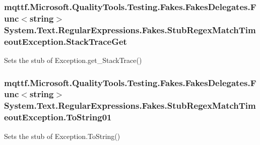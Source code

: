 \hypertarget{class_system_1_1_text_1_1_regular_expressions_1_1_fakes_1_1_stub_regex_match_timeout_exception_a6d79cfcf58c9b94d87359c6d5faeb21f}{
\subsubsection[{Stack\-Trace\-Get}]{\setlength{\rightskip}{0pt plus 5cm}mqttf.\-Microsoft.\-Quality\-Tools.\-Testing.\-Fakes.\-Fakes\-Delegates.\-Func$<$string$>$ System.\-Text.\-Regular\-Expressions.\-Fakes.\-Stub\-Regex\-Match\-Timeout\-Exception.\-Stack\-Trace\-Get}}\label{class_system_1_1_text_1_1_regular_expressions_1_1_fakes_1_1_stub_regex_match_timeout_exception_a6d79cfcf58c9b94d87359c6d5faeb21f}


Sets the stub of Exception.\-get\-\_\-\-Stack\-Trace()

\hypertarget{class_system_1_1_text_1_1_regular_expressions_1_1_fakes_1_1_stub_regex_match_timeout_exception_a05f3ef6e82a87a30d07e1e2658cd6e46}{
\subsubsection[{To\-String01}]{\setlength{\rightskip}{0pt plus 5cm}mqttf.\-Microsoft.\-Quality\-Tools.\-Testing.\-Fakes.\-Fakes\-Delegates.\-Func$<$string$>$ System.\-Text.\-Regular\-Expressions.\-Fakes.\-Stub\-Regex\-Match\-Timeout\-Exception.\-To\-String01}}\label{class_system_1_1_text_1_1_regular_expressions_1_1_fakes_1_1_stub_regex_match_timeout_exception_a05f3ef6e82a87a30d07e1e2658cd6e46}


Sets the stub of Exception.\-To\-String()



